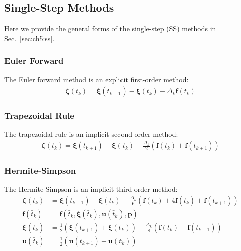 \subsection{Single-Step Methods\label{sec:app3:ss}}

Here we provide the general forms of the single-step (SS) methods in Sec.~\ref{sec:ch5:ss}.

\subsubsection{Euler Forward}
The Euler forward method is an explicit first-order method:
\begin{align}
\bm{\zeta}(t_k) = \bm{\xi}(t_{k+1}) - \bm{\xi}(t_{k}) - \Delta_k \bm{f}(t_k)
\end{align}

\subsubsection{Trapezoidal Rule}
The trapezoidal rule is an implicit second-order method:
\begin{align}
\bm{\zeta}(t_k) = \bm{\xi}(t_{k+1}) - \bm{\xi}(t_{k}) - \frac{\Delta_k}{2} \left( \bm{f}(t_k) + \bm{f}(t_{k+1}) \right)
\end{align}

\subsubsection{Hermite-Simpson}
The Hermite-Simpson is an implicit third-order method:
\begin{subequations}
\begin{align}
\bm{\zeta}(t_k) &= \bm{\xi}(t_{k+1}) - \bm{\xi}(t_{k}) - \frac{\Delta_k}{6} \left( \bm{f}(t_k) + 4\bm{f}(\bar{t}_k) + \bm{f}(t_{k+1}) \right) \label{eq:app3:hs:zeta}  \\
\bm{f}(\bar{t}_k) &= \bm{f}\left( \bar{t}_k, \bm{\xi}(\bar{t}_k), \bm{u}(\bar{t}_k), \bm{p} \right) \label{eq:app3:hs:f} \\
\bm{\xi}(\bar{t}_k) &= \frac{1}{2}\left( \bm{\xi}(t_{k+1}) + \bm{\xi}(t_{k})  \right) + \frac{\Delta_k}{8}\left( \bm{f}(t_k) - \bm{f}(t_{k+1}) \right) \label{eq:app3:hs:xi} \\
\bm{u}(\bar{t}_k) &= \frac{1}{2} \left( \bm{u}(t_{k+1}) + \bm{u}(t_{k}) \right)
\end{align}
\end{subequations}

